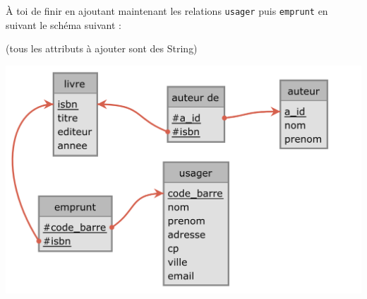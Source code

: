 \documentclass[a4paper,17pt]{extarticle}
\makeatletter
\let\origfigure\figure
\let\endorigfigure\endfigure
\renewenvironment{figure}[1][2] {
    \expandafter\origfigure\expandafter[H]
} {
    \endorigfigure
}
\newcommand{\boxspacing}{\kern\kvtcb@left@rule\kern\kvtcb@boxsep}
\newcommand{\prompt}[4]{
        \ttfamily\llap{{\color{#2}[#3]:\hspace{3pt}#4}}\vspace{-\baselineskip}
    }
\makeatother
\begin{document}
    À toi de finir en ajoutant maintenant les relations \texttt{usager} puis
\texttt{emprunt} en suivant le schéma suivant :

(tous les attributs à ajouter sont des String)

    \begin{figure}
\centering
\includegraphics{./img5relations.png}
\caption{Schéma des 5 relations}
\end{figure}

        {\scriptsize
    \begin{tcolorbox}[breakable, size=fbox, boxrule=1pt, pad at break*=1mm,colback=cellbackground, colframe=cellborder]
\prompt{In}{incolor}{ }{\boxspacing}
\begin{Verbatim}[commandchars=\\\{\}]

\end{Verbatim}
\end{tcolorbox}
    }


    
    
    
\end{document}
